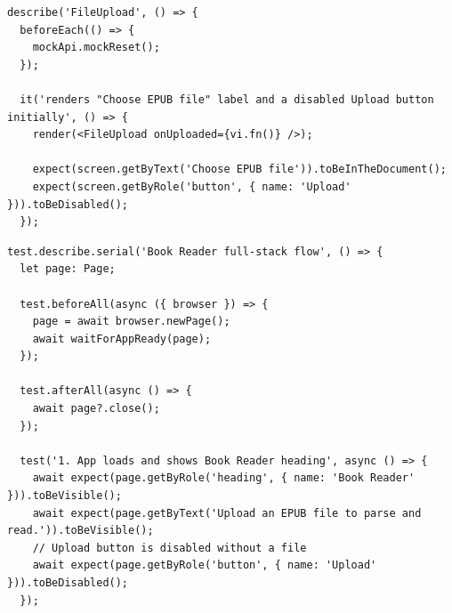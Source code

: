 \begin{lstlisting}[style=pythonStyle, label={lst:frontend_integ}, caption={
    Przykład testów integracyjnych dla warstwy prezentacji.
}]
describe('FileUpload', () => {
  beforeEach(() => {
    mockApi.mockReset();
  });

  it('renders "Choose EPUB file" label and a disabled Upload button initially', () => {
    render(<FileUpload onUploaded={vi.fn()} />);

    expect(screen.getByText('Choose EPUB file')).toBeInTheDocument();
    expect(screen.getByRole('button', { name: 'Upload' })).toBeDisabled();
  });
\end{lstlisting}

\begin{lstlisting}[style=pythonStyle, label={lst:frontend_integ}, caption={
    Przykład testów end-to-end dla warstwy prezentacji.
}]
test.describe.serial('Book Reader full-stack flow', () => {
  let page: Page;

  test.beforeAll(async ({ browser }) => {
    page = await browser.newPage();
    await waitForAppReady(page);
  }); 

  test.afterAll(async () => {
    await page?.close();
  });

  test('1. App loads and shows Book Reader heading', async () => {
    await expect(page.getByRole('heading', { name: 'Book Reader' })).toBeVisible();
    await expect(page.getByText('Upload an EPUB file to parse and read.')).toBeVisible();
    // Upload button is disabled without a file
    await expect(page.getByRole('button', { name: 'Upload' })).toBeDisabled();
  });
\end{lstlisting}
